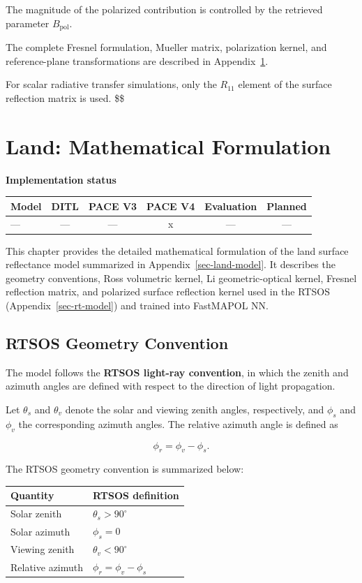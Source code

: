 \documentclass[
  11pt,
  letterpaper,
]{scrreprt}
\begin{document}
The magnitude of the polarized contribution is controlled by the
retrieved parameter \(B_{\mathrm{pol}}\).

The complete Fresnel formulation, Mueller matrix, polarization kernel,
and reference-plane transformations are described in
Appendix~\ref{sec-land-model-math}.

For scalar radiative transfer simulations, only the \(R_{11}\) element
of the surface reflection matrix is used. \$\$

\chapter{Land: Mathematical Formulation}\label{sec-land-model-math}

\textbf{Implementation status}

\begin{longtable}[]{@{}lccccc@{}}
\toprule\noalign{}
Model & DITL & PACE V3 & PACE V4 & Evaluation & Planned \\
\midrule\noalign{}
\endhead
\bottomrule\noalign{}
\endlastfoot
--- & --- & --- & x & --- & --- \\
\end{longtable}

This chapter provides the detailed mathematical formulation of the land
surface reflectance model summarized in Appendix~\ref{sec-land-model}.
It describes the geometry conventions, Ross volumetric kernel, Li
geometric-optical kernel, Fresnel reflection matrix, and polarized
surface reflection kernel used in the RTSOS
(Appendix~\ref{sec-rt-model}) and trained into FastMAPOL NN.

\section{RTSOS Geometry Convention}\label{rtsos-geometry-convention}

The model follows the \textbf{RTSOS light-ray convention}, in which the
zenith and azimuth angles are defined with respect to the direction of
light propagation.

Let \(\theta_s\) and \(\theta_v\) denote the solar and viewing zenith
angles, respectively, and \(\phi_s\) and \(\phi_v\) the corresponding
azimuth angles. The relative azimuth angle is defined as

\[
\phi_r = \phi_v-\phi_s.
\]

The RTSOS geometry convention is summarized below:

\begin{longtable}[]{@{}ll@{}}
\toprule\noalign{}
Quantity & RTSOS definition \\
\midrule\noalign{}
\endhead
\bottomrule\noalign{}
\endlastfoot
Solar zenith & \(\theta_s > 90^\circ\) \\
Solar azimuth & \(\phi_s=0\) \\
Viewing zenith & \(\theta_v < 90^\circ\) \\
Relative azimuth & \(\phi_r=\phi_v-\phi_s\) \\
\end{longtable}
\end{document}
